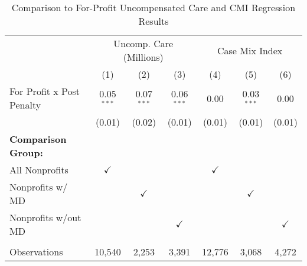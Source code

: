 \begin{table}[htbp]
   \caption{\label{tab:forprofit_uncomp_CMI_fullsample} Comparison to For-Profit Uncompensated Care and CMI Regression Results}
   \bigskip
   \centering
   \begin{tabular}{lcccccc}
      \toprule
       & \multicolumn{3}{c}{Uncomp. Care (Millions)} & \multicolumn{3}{c}{Case Mix Index}\\
                                  & (1)           & (2)           & (3)           & (4)           & (5)           & (6)\\  
      \midrule 
      For Profit x Post Penalty   & 0.05$^{***}$  & 0.07$^{***}$  & 0.06$^{***}$  & 0.00          & 0.03$^{***}$  & 0.00\\   
                                  & (0.01)        & (0.02)        & (0.01)        & (0.01)        & (0.01)        & (0.01)\\   
      \textbf{Comparison Group:}  &               &               &               &               &               & \\  
      All Nonprofits              & $\checkmark$  &               &               & $\checkmark$  &               & \\  
      Nonprofits w/ MD            &               & $\checkmark$  &               &               & $\checkmark$  & \\  
      Nonprofits w/out MD         &               &               & $\checkmark$  &               &               & $\checkmark$\\   
       \\
      Observations                & 10,540        & 2,253         & 3,391         & 12,776        & 3,068         & 4,272\\  
      \bottomrule
   \end{tabular}
\end{table}
